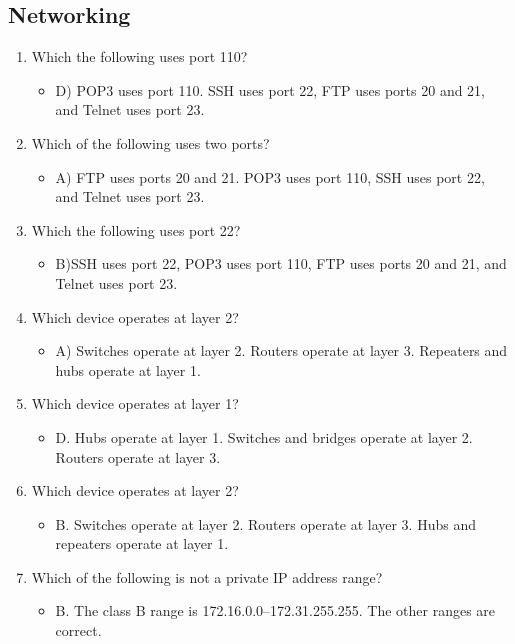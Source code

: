 \documentclass{article}
\begin{document}
\subsection{Networking} 
\begin{enumerate}
    \item Which the following uses port 110?
    \begin{itemize}
        \item D) POP3 uses port 110. SSH uses port 22, FTP uses ports 20 and 21, and Telnet uses port 23.
    \end{itemize}
    \item Which of the following uses two ports?
     \begin{itemize}
        \item A) FTP uses ports 20 and 21. POP3 uses port 110, SSH uses port 22, and Telnet uses port 23.
    \end{itemize}
    \item Which the following uses port 22?
     \begin{itemize}
        \item B)SSH uses port 22, POP3 uses port 110, FTP uses ports 20 and 21, and Telnet uses port 23.
    \end{itemize}
    \item Which device operates at layer 2?
     \begin{itemize}
        \item A) Switches operate at layer 2. Routers operate at layer 3. Repeaters and hubs operate at layer 1.
    \end{itemize}
    \item Which device operates at layer 1?
     \begin{itemize}
        \item D. Hubs operate at layer 1. Switches and bridges operate at layer 2. Routers operate at layer 3.
    \end{itemize}
    \item Which device operates at layer 2?
     \begin{itemize}
        \item B. Switches operate at layer 2. Routers operate at layer 3. Hubs and repeaters operate at layer 1.
    \end{itemize}
    \item Which of the following is not a private IP address range?
     \begin{itemize}
        \item B. The class B range is 172.16.0.0–172.31.255.255. The other ranges are correct.

\end{itemize}
\end{enumerate}
\end{document}
